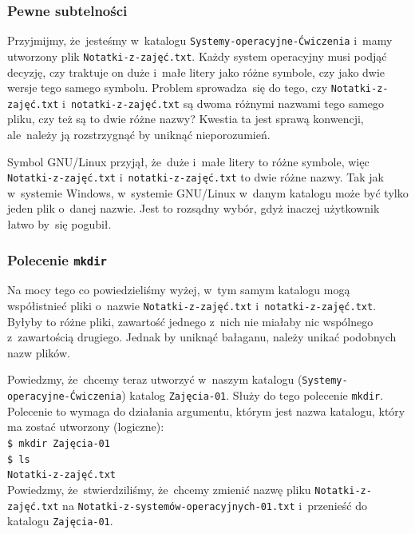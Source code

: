 \documentclass[10pt,t]{beamer}
\begin{document}
\begin{frame}
  \frametitle{Pewne subtelności}


  Przyjmijmy, że~jesteśmy w~katalogu \texttt{Systemy-operacyjne-Ćwiczenia}
  i~mamy utworzony plik \texttt{Notatki-z-zajęć.txt}. Każdy system
  operacyjny musi podjąć decyzję, czy traktuje on duże i~małe litery
  jako różne symbole, czy jako dwie wersje tego samego symbolu. Problem
  sprowadza~się do tego, czy \texttt{Notatki-z-zajęć.txt}
  i~\texttt{notatki-z-zajęć.txt} są dwoma różnymi nazwami tego samego pliku,
  czy też są to dwie różne nazwy? Kwestia ta jest sprawą konwencji,
  ale~należy ją rozstrzygnąć by uniknąć nieporozumień.

  Symbol GNU/Linux przyjął, że~duże i~małe litery to \alert{różne} symbole,
  więc \texttt{Notatki-z-zajęć.txt} i~\texttt{notatki-z-zajęć.txt} to dwie
  różne nazwy. Tak jak w~systemie Windows, w~systemie GNU/Linux w~danym
  katalogu może być tylko jeden plik o~danej nazwie. Jest to rozsądny wybór,
  gdyż inaczej użytkownik łatwo by~się pogubił.

\end{frame}





\begin{frame}
  \frametitle{Polecenie \texttt{mkdir}}


  Na mocy tego co powiedzieliśmy wyżej, w~tym samym katalogu mogą
  współistnieć pliki o~nazwie \texttt{Notatki-z-zajęć.txt}
  i~\texttt{notatki-z-zajęć.txt}. Byłyby to \alert{różne} pliki, zawartość
  jednego z~nich nie miałaby nic wspólnego z~zawartością drugiego. Jednak
  by uniknąć bałaganu, należy unikać podobnych nazw plików.

  Powiedzmy, że~chcemy teraz utworzyć w~naszym katalogu
  (\texttt{Systemy-operacyjne-Ćwiczenia}) katalog \texttt{Zajęcia-01}.
  Służy do tego polecenie
  {\texttt{mkdir}}. Polecenie to wymaga do działania argumentu, którym
  jest nazwa katalogu, który ma zostać utworzony (logiczne): \\
  \texttt{\$ mkdir Zajęcia-01} \\
  \texttt{\$ ls} \\
   \quad \texttt{Notatki-z-zajęć.txt} \\
  Powiedzmy, że~stwierdziliśmy, że~chcemy zmienić nazwę pliku
  \texttt{Notatki-z-zajęć.txt} na
  \texttt{Notatki-z-systemów-operacyjnych-01.txt} i~przenieść do katalogu
  \texttt{Zajęcia-01}.

\end{frame}
\end{document}

